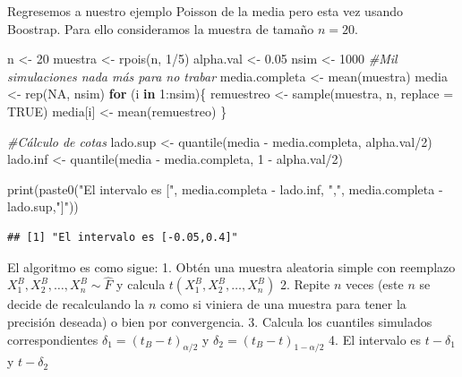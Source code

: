 \documentclass[
]{book}
\newenvironment{Shaded}{\begin{snugshade}}{\end{snugshade}}
\newcommand{\AttributeTok}[1]{\textcolor[rgb]{0.77,0.63,0.00}{#1}}
\newcommand{\CommentTok}[1]{\textcolor[rgb]{0.56,0.35,0.01}{\textit{#1}}}
\newcommand{\ConstantTok}[1]{\textcolor[rgb]{0.00,0.00,0.00}{#1}}
\newcommand{\ControlFlowTok}[1]{\textcolor[rgb]{0.13,0.29,0.53}{\textbf{#1}}}
\newcommand{\DecValTok}[1]{\textcolor[rgb]{0.00,0.00,0.81}{#1}}
\newcommand{\FloatTok}[1]{\textcolor[rgb]{0.00,0.00,0.81}{#1}}
\newcommand{\FunctionTok}[1]{\textcolor[rgb]{0.00,0.00,0.00}{#1}}
\newcommand{\NormalTok}[1]{#1}
\newcommand{\OtherTok}[1]{\textcolor[rgb]{0.56,0.35,0.01}{#1}}
\newcommand{\SpecialCharTok}[1]{\textcolor[rgb]{0.00,0.00,0.00}{#1}}
\newcommand{\StringTok}[1]{\textcolor[rgb]{0.31,0.60,0.02}{#1}}
\begin{document}
Regresemos a nuestro ejemplo Poisson de la media pero esta vez usando Boostrap. Para ello consideramos la muestra de tamaño \(n = 20\).

\begin{Shaded}
\begin{Highlighting}[]
\NormalTok{n         }\OtherTok{\textless{}{-}} \DecValTok{20}
\NormalTok{muestra   }\OtherTok{\textless{}{-}} \FunctionTok{rpois}\NormalTok{(n, }\DecValTok{1}\SpecialCharTok{/}\DecValTok{5}\NormalTok{)}
\NormalTok{alpha.val }\OtherTok{\textless{}{-}} \FloatTok{0.05}
\NormalTok{nsim      }\OtherTok{\textless{}{-}} \DecValTok{1000} \CommentTok{\#Mil simulaciones nada más para no trabar}
\NormalTok{media.completa }\OtherTok{\textless{}{-}} \FunctionTok{mean}\NormalTok{(muestra)}
\NormalTok{media     }\OtherTok{\textless{}{-}} \FunctionTok{rep}\NormalTok{(}\ConstantTok{NA}\NormalTok{, nsim)}
\ControlFlowTok{for}\NormalTok{ (i }\ControlFlowTok{in} \DecValTok{1}\SpecialCharTok{:}\NormalTok{nsim)\{}
\NormalTok{  remuestreo }\OtherTok{\textless{}{-}} \FunctionTok{sample}\NormalTok{(muestra, n, }\AttributeTok{replace =} \ConstantTok{TRUE}\NormalTok{)}
\NormalTok{  media[i]   }\OtherTok{\textless{}{-}} \FunctionTok{mean}\NormalTok{(remuestreo)}
\NormalTok{\}}

\CommentTok{\#Cálculo de cotas}
\NormalTok{lado.sup }\OtherTok{\textless{}{-}} \FunctionTok{quantile}\NormalTok{(media }\SpecialCharTok{{-}}\NormalTok{ media.completa, alpha.val}\SpecialCharTok{/}\DecValTok{2}\NormalTok{)}
\NormalTok{lado.inf }\OtherTok{\textless{}{-}} \FunctionTok{quantile}\NormalTok{(media }\SpecialCharTok{{-}}\NormalTok{ media.completa, }\DecValTok{1} \SpecialCharTok{{-}}\NormalTok{ alpha.val}\SpecialCharTok{/}\DecValTok{2}\NormalTok{) }

\FunctionTok{print}\NormalTok{(}\FunctionTok{paste0}\NormalTok{(}\StringTok{"El intervalo es ["}\NormalTok{, media.completa }\SpecialCharTok{{-}}\NormalTok{ lado.inf, }
             \StringTok{","}\NormalTok{, media.completa }\SpecialCharTok{{-}}\NormalTok{ lado.sup,}\StringTok{"]"}\NormalTok{))}
\end{Highlighting}
\end{Shaded}

\begin{verbatim}
## [1] "El intervalo es [-0.05,0.4]"
\end{verbatim}

El algoritmo es como sigue:
1. Obtén una muestra aleatoria simple con reemplazo \(X_1^B, X_2^B, \dots, X_n^B \sim \hat{F}\) y calcula \(t(X_1^B, X_2^B, \dots, X_n^B)\)
2. Repite \(n\) veces (este \(n\) se decide de recalculando la \(n\) como si viniera de una muestra para tener la precisión deseada) o bien por convergencia.
3. Calcula los cuantiles simulados correspondientes \(\delta_1 = (t_B - t)_{\alpha/2}\) y \(\delta_2 = (t_B - t)_{1 - \alpha/2}\)
4. El intervalo es \(t - \delta_1\) y \(t - \delta_2\)
\end{document}
